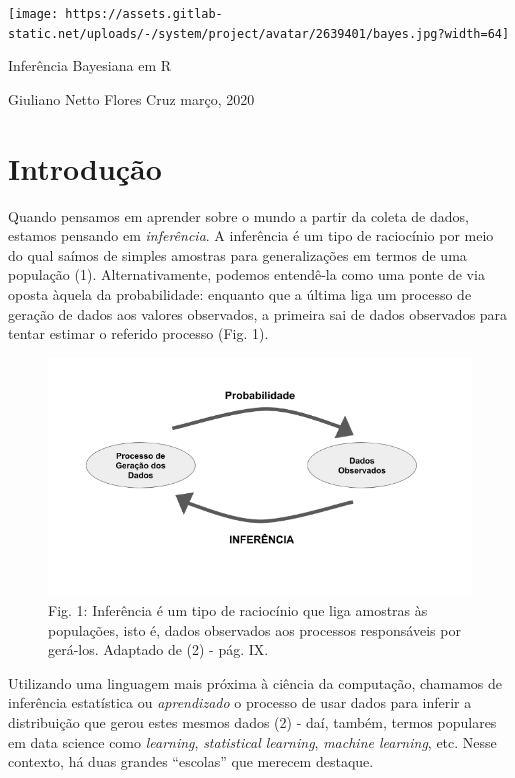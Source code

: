 \documentclass[]{tufte-handout}
\date{}
\begin{document}
\texttt{[image: https://assets.gitlab-static.net/uploads/-/system/project/avatar/2639401/bayes.jpg?width=64]}

Inferência Bayesiana em R

Giuliano Netto Flores Cruz março, 2020

\hypertarget{introduuxe7uxe3o}{%
\section{Introdução}\label{introduuxe7uxe3o}}

Quando pensamos em aprender sobre o mundo a partir da coleta de dados,
estamos pensando em \emph{inferência}. A inferência é um tipo de
raciocínio por meio do qual saímos de simples amostras para
generalizações em termos de uma população (1). Alternativamente, podemos
entendê-la como uma ponte de via oposta àquela da probabilidade:
enquanto que a última liga um processo de geração de dados aos valores
observados, a primeira sai de dados observados para tentar estimar o
referido processo (Fig. 1).

\begin{figure}
\centering
\includegraphics{imgs/fig1.png}
\caption{Fig. 1: Inferência é um tipo de raciocínio que liga amostras às
populações, isto é, dados observados aos processos responsáveis por
gerá-los. Adaptado de (2) - pág. IX.}
\end{figure}

Utilizando uma linguagem mais próxima à ciência da computação, chamamos
de inferência estatística ou \emph{aprendizado} o processo de usar dados
para inferir a distribuição que gerou estes mesmos dados (2) - daí,
também, termos populares em data science como \emph{learning},
\emph{statistical learning}, \emph{machine learning}, etc. Nesse
contexto, há duas grandes ``escolas'' que merecem destaque.
\end{document}
